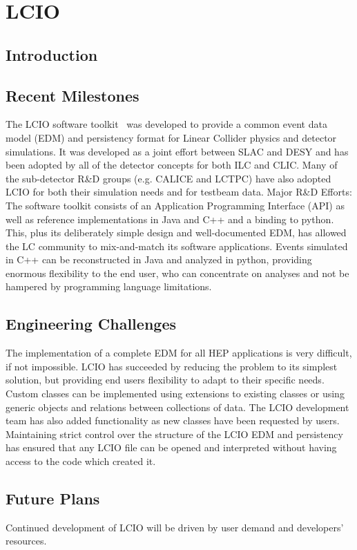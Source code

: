 \section{LCIO}

\subsection{Introduction}

\subsection{Recent Milestones}
The LCIO software toolkit~\cite{lcioWebsite} was developed to provide a common event data model
(EDM) and persistency format for Linear Collider physics and detector
simulations. It was developed as a joint effort between SLAC and DESY and has
been adopted by all of the detector concepts for both ILC and CLIC. Many of
the sub-detector R\&D groups (e.g. CALICE and LCTPC) have also adopted LCIO for
both their simulation needs and for testbeam data. Major R\&D Efforts: The
software toolkit consists of an Application Programming Interface (API) as well
as reference implementations in Java and C++ and a binding to python. This, plus
its deliberately simple design and well-documented EDM, has allowed the LC
community to mix-and-match its software applications. Events simulated in C++
can be reconstructed in Java and analyzed in python, providing enormous
flexibility to the end user, who can concentrate on analyses and not be hampered
by programming language limitations.

\subsection{Engineering Challenges}
The implementation of a complete EDM for all HEP applications is very difficult,
if not impossible. LCIO has succeeded by reducing the problem to its simplest
solution, but providing end users flexibility to adapt to their specific needs.
Custom classes can be implemented using extensions to existing classes or using
generic objects and relations between collections of data. The LCIO development
team has also added functionality as new classes have been requested by users.
Maintaining strict control over the structure of the LCIO EDM and persistency
has ensured that any LCIO file can be opened and interpreted without having
access to the code which created it.

\subsection{Future Plans}
Continued development of LCIO will be driven by user demand and developers' resources.

